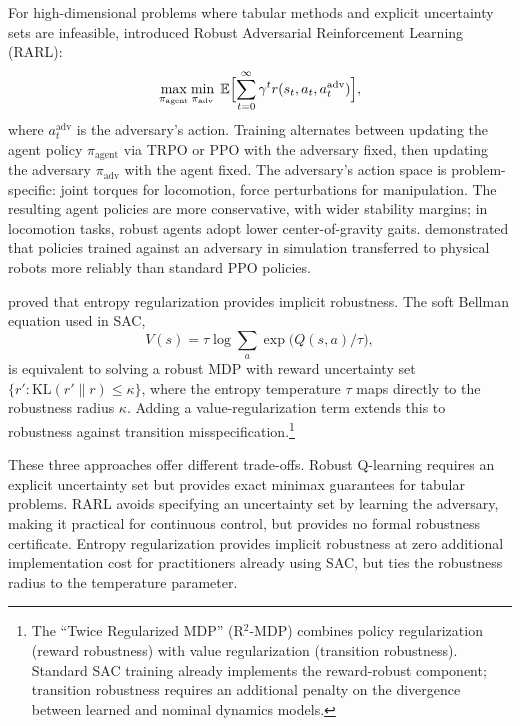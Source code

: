 For high-dimensional problems where tabular methods and explicit
uncertainty sets are infeasible, \citet{Pinto2017} introduced Robust
Adversarial Reinforcement Learning (RARL):
\begin{equation}
  \max_{\pi_{\text{agent}}} \min_{\pi_{\text{adv}}} \;
  \mathbb{E}\Bigl[\sum_{t=0}^\infty \gamma^t
    r(s_t, a_t, a_t^{\text{adv}})
  \Bigr],
  \label{eq:rarl}
\end{equation}
where $a_t^{\text{adv}}$ is the adversary's action. Training alternates
between updating the agent policy $\pi_{\text{agent}}$ via TRPO or PPO
with the adversary fixed, then updating the adversary
$\pi_{\text{adv}}$ with the agent fixed. The adversary's action space is
problem-specific: joint torques for locomotion, force perturbations for
manipulation. The resulting agent policies are more conservative, with
wider stability margins; in locomotion tasks, robust agents adopt lower
center-of-gravity gaits. \citet{Pinto2017} demonstrated that policies
trained against an adversary in simulation transferred to physical robots
more reliably than standard PPO policies.

\citet{Derman2021} proved that entropy regularization provides implicit
robustness. The soft Bellman equation used in SAC,
\begin{equation}
  V(s) = \tau \log \sum_a \exp\bigl(Q(s,a)/\tau\bigr),
  \label{eq:soft_bellman}
\end{equation}
is equivalent to solving a robust MDP with reward uncertainty set
$\{r' : \text{KL}(r' \| r) \leq \kappa\}$, where the entropy temperature
$\tau$ maps directly to the robustness radius $\kappa$. Adding a
value-regularization term extends this to robustness against transition
misspecification.\footnote{The ``Twice Regularized MDP'' (R$^2$-MDP)
combines policy regularization (reward robustness) with value
regularization (transition robustness). Standard SAC training already
implements the reward-robust component; transition robustness requires an
additional penalty on the divergence between learned and nominal dynamics
models.}

These three approaches offer different trade-offs. Robust Q-learning
requires an explicit uncertainty set but provides exact minimax guarantees
for tabular problems. RARL avoids specifying an uncertainty set by learning
the adversary, making it practical for continuous control, but provides no
formal robustness certificate. Entropy regularization provides implicit
robustness at zero additional implementation cost for practitioners already
using SAC, but ties the robustness radius to the temperature parameter.

